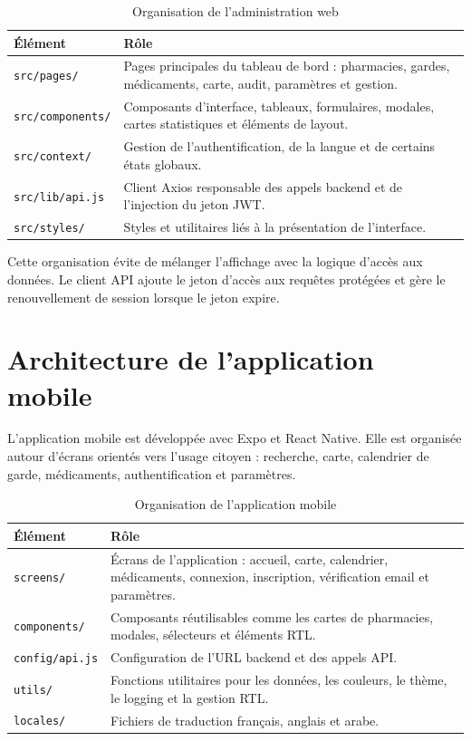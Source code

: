 \begin{table}[H]
    \centering
    \caption{Organisation de l'administration web}
    \begin{tabular}{L{4cm}L{9cm}}
        \toprule
        \textbf{Élément} & \textbf{Rôle} \\
        \midrule
        \texttt{src/pages/} & Pages principales du tableau de bord : pharmacies, gardes, médicaments, carte, audit, paramètres et gestion. \\
        \texttt{src/components/} & Composants d'interface, tableaux, formulaires, modales, cartes statistiques et éléments de layout. \\
        \texttt{src/context/} & Gestion de l'authentification, de la langue et de certains états globaux. \\
        \texttt{src/lib/api.js} & Client Axios responsable des appels backend et de l'injection du jeton JWT. \\
        \texttt{src/styles/} & Styles et utilitaires liés à la présentation de l'interface. \\
        \bottomrule
    \end{tabular}
\end{table}

Cette organisation évite de mélanger l'affichage avec la logique d'accès aux données. Le client API ajoute
le jeton d'accès aux requêtes protégées et gère le renouvellement de session lorsque le jeton expire.

\section{Architecture de l'application mobile}

L'application mobile est développée avec Expo et React Native. Elle est organisée autour d'écrans
orientés vers l'usage citoyen : recherche, carte, calendrier de garde, médicaments, authentification et
paramètres.

\begin{table}[H]
    \centering
    \caption{Organisation de l'application mobile}
    \begin{tabular}{L{4cm}L{9cm}}
        \toprule
        \textbf{Élément} & \textbf{Rôle} \\
        \midrule
        \texttt{screens/} & Écrans de l'application : accueil, carte, calendrier, médicaments, connexion, inscription, vérification email et paramètres. \\
        \texttt{components/} & Composants réutilisables comme les cartes de pharmacies, modales, sélecteurs et éléments RTL. \\
        \texttt{config/api.js} & Configuration de l'URL backend et des appels API. \\
        \texttt{utils/} & Fonctions utilitaires pour les données, les couleurs, le thème, le logging et la gestion RTL. \\
        \texttt{locales/} & Fichiers de traduction français, anglais et arabe. \\
        \bottomrule
    \end{tabular}
\end{table}

